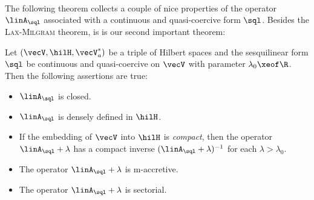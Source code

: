 \documentclass[11pt,twoside]{article}
\begin{document}
\paragraph{} %
The following theorem collects a couple of nice properties 
of the operator $\linA_{\sql}$
associated with a continuous and quasi-coercive form $\sql$.
Besides the \textsc{Lax-Milgram} theorem,
is is our second important theorem:

\begin{theorem1}\label{XI_QUASI-COERCIVE_FORMS_AND_ASSOCIATED_OPERATORS}
Let $(\vecV,\hilH,\vecV_a^*)$ be a triple of Hilbert spaces
and the sesquilinear form $\sql$ be continuous and quasi-coercive
on $\vecV$ with parameter $\lambda_0 \xeof \R$.
Then the following assertions are true:

\begin{itemize}[leftmargin=17pt]
\item[(a)]
$\linA_{\sql}$ is closed.

\item[(b)]
$\linA_{\sql}$ is densely defined in $\hilH$.

\item[(c)]
If the embedding of $\vecV$ into $\hilH$ is \textit{compact},
then the operator $\linA_{\sql} + \lambda$ has a compact inverse
$(\linA_{\sql} +\lambda)^{-1}$ for each $\lambda > \lambda_0$.

\item[(d)]
The operator $\linA_{\sql} + \lambda$ is m-accretive.

\item[(e)]
The operator $\linA_{\sql} + \lambda$ is sectorial.
\end{itemize}
\end{theorem1}
\end{document}
